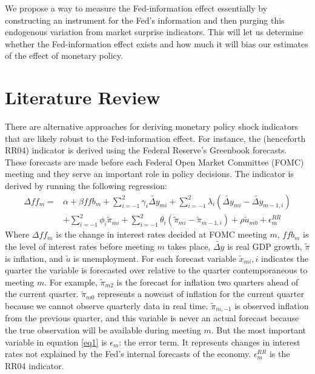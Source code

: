 \documentclass[a4paper,man,floatsintext,natbib]{apa6}
\begin{document}
	We propose a way to measure the Fed-information effect essentially by constructing an instrument for the Fed's information and then purging this endogenous variation from market surprise indicators. This will let us determine whether the Fed-information effect exists and how much it will bias our estimates of the effect of monetary policy.
	
	\section{Literature Review}
	There are alternative approaches for deriving monetary policy shock indicators that are likely robust to the Fed-information effect. For instance, the \citeauthor{Romer2004} (henceforth RR04) indicator is derived using the Federal Reserve's Greenbook forecasts. These forecasts are made before each Federal Open Market Committee (FOMC) meeting and they serve an important role in policy decisions. The indicator is derived by running the following regression: 
	\begin{align*}
		\Delta ff_m = &\alpha + \beta ffb_m + \sum_{i=-1}^{2} \gamma_i \widetilde{\Delta y}_{mi} + \sum^2_{i=-1} \lambda_i \left(\widetilde{\Delta y}_{mi}-\widetilde{\Delta y}_{m-1,i}\right) \tag{1} \label{eq1}\\
		&+\sum^{2}_{i=-1} \phi_i \tilde{\pi}_{mi} + \sum^2_{i=-1} \theta_i \left(\tilde{ \pi}_{mi}-\tilde{ \pi}_{m-1,i}\right) + \rho \tilde{u}_{m0} + \epsilon^{RR}_m
	\end{align*}
	Where \(\Delta ff_m\) is the change in interest rates decided at FOMC meeting \(m\), \(ffb_m\) is the level of interest rates before meeting \(m\) takes place, \(\widetilde{\Delta y}\) is real GDP growth, \(\tilde{\pi}\) is inflation, and \(\tilde{u}\) is unemployment. For each forecast variable \(\tilde{x}_{mi}, i\) indicates the quarter the variable is forecasted over relative to the quarter contemporaneous to meeting \(m\). For example, \(\tilde{\pi}_{m2}\) is the forecast for inflation two quarters ahead of the current quarter. \(\tilde{\pi}_{m0}\) represents a nowcast of inflation for the current quarter because we cannot observe quarterly data in real time. \(\tilde{\pi}_{m,-1}\) is observed inflation from the previous quarter, and this variable is never an actual forecast because the true observation will be available during meeting \(m\). But the most important variable in equation \ref{eq1} is \(\epsilon_m\):  the error term. It represents changes in interest rates not explained by the Fed's internal forecasts of the economy. \(\epsilon^{RR}_m\) is the RR04 indicator. \\
\end{document}
